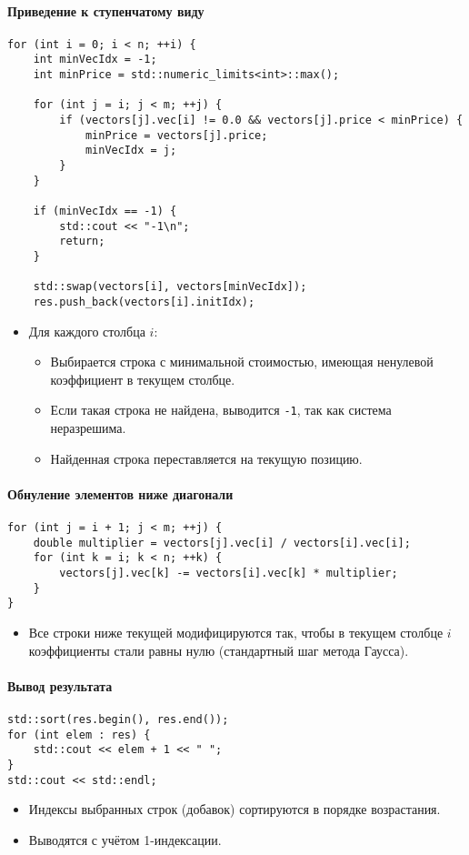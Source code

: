 \documentclass[12pt]{article}
\begin{document}
\paragraph{Приведение к ступенчатому виду}
\begin{verbatim}
for (int i = 0; i < n; ++i) {
    int minVecIdx = -1;
    int minPrice = std::numeric_limits<int>::max();

    for (int j = i; j < m; ++j) {
        if (vectors[j].vec[i] != 0.0 && vectors[j].price < minPrice) {
            minPrice = vectors[j].price;
            minVecIdx = j;
        }
    }

    if (minVecIdx == -1) {
        std::cout << "-1\n";
        return;
    }

    std::swap(vectors[i], vectors[minVecIdx]);
    res.push_back(vectors[i].initIdx);
\end{verbatim}
\begin{itemize}
    \item Для каждого столбца \( i \):
    \begin{itemize}
        \item Выбирается строка с минимальной стоимостью, имеющая ненулевой коэффициент в текущем столбце.
        \item Если такая строка не найдена, выводится \texttt{-1}, так как система неразрешима.
        \item Найденная строка переставляется на текущую позицию.
    \end{itemize}
\end{itemize}

\paragraph{Обнуление элементов ниже диагонали}
\begin{verbatim}
for (int j = i + 1; j < m; ++j) {
    double multiplier = vectors[j].vec[i] / vectors[i].vec[i];
    for (int k = i; k < n; ++k) {
        vectors[j].vec[k] -= vectors[i].vec[k] * multiplier;
    }
}
\end{verbatim}
\begin{itemize}
    \item Все строки ниже текущей модифицируются так, чтобы в текущем столбце \( i \) коэффициенты стали равны нулю (стандартный шаг метода Гаусса).
\end{itemize}

\paragraph{Вывод результата}
\begin{verbatim}
std::sort(res.begin(), res.end());
for (int elem : res) {
    std::cout << elem + 1 << " ";
}
std::cout << std::endl;
\end{verbatim}
\begin{itemize}
    \item Индексы выбранных строк (добавок) сортируются в порядке возрастания.
    \item Выводятся с учётом 1-индексации.
\end{itemize}
\end{document}
